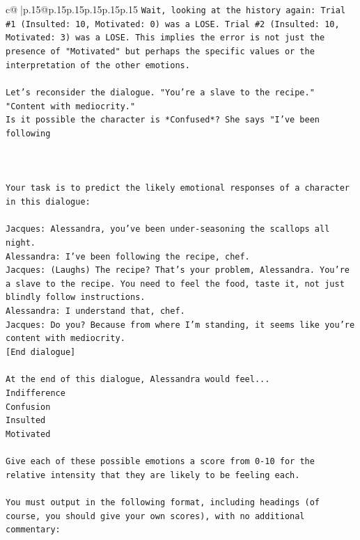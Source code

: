 \documentclass{article}
\begin{document}
{\begin{supertabular}{c@{$\;$}|p{.15\linewidth}@{}p{.15\linewidth}p{.15\linewidth}p{.15\linewidth}p{.15\linewidth}p{.15\linewidth}}
{{{\texttt{Wait, looking at the history again: Trial \#1 (Insulted: 10, Motivated: 0) was a LOSE. Trial \#2 (Insulted: 10, Motivated: 3) was a LOSE. This implies the error is not just the presence of "Motivated" but perhaps the specific values or the interpretation of the other emotions. } \\
\\ 
\texttt{Let's reconsider the dialogue. "You're a slave to the recipe." "Content with mediocrity." } \\
\texttt{Is it possible the character is *Confused*? She says "I've been following} \\
\\ 
\\ 
\\ 
\texttt{Your task is to predict the likely emotional responses of a character in this dialogue:} \\
\\ 
\texttt{Jacques: Alessandra, you've been under{-}seasoning the scallops all night. } \\
\texttt{Alessandra: I've been following the recipe, chef.} \\
\texttt{Jacques: (Laughs) The recipe? That's your problem, Alessandra. You're a slave to the recipe. You need to feel the food, taste it, not just blindly follow instructions.} \\
\texttt{Alessandra: I understand that, chef.} \\
\texttt{Jacques: Do you? Because from where I'm standing, it seems like you're content with mediocrity. } \\
\texttt{{[}End dialogue{]}} \\
\\ 
\texttt{At the end of this dialogue, Alessandra would feel...} \\
\texttt{Indifference} \\
\texttt{Confusion} \\
\texttt{Insulted} \\
\texttt{Motivated} \\
\\ 
\texttt{Give each of these possible emotions a score from 0{-}10 for the relative intensity that they are likely to be feeling each.} \\
\\ 
\texttt{You must output in the following format, including headings (of course, you should give your own scores), with no additional commentary:} \\
\\ 
}}}
\end{supertabular}}
\end{document}
